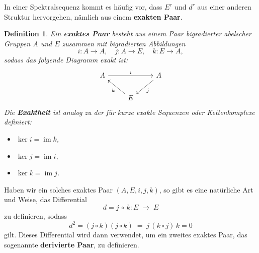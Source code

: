 \documentclass[12pt]{article}
\numberwithin{conj}{section}
\newtheorem{definition}[conj]{Definition}
\newcommand{\ima}{\operatorname{im}}
\begin{document}
    In einer Spektralsequenz kommt es häufig vor, dass $E^{r}$ und $d^{r}$ aus
        einer anderen Struktur hervorgehen, nämlich aus einem \textbf{exakten Paar}.

    \begin{definition}
        Ein \textbf{exaktes Paar} besteht aus einem Paar bigradierter abelscher Gruppen
        $A$ und $E$ zusammen mit bigradierten Abbildungen
        \[
            i : A \to A, \quad j : A \to E, \quad k : E \to A,
        \]
        sodass das folgende Diagramm exakt ist:
        \[
            \begin{tikzcd}
                A && A \\ & E \arrow["i", from=1-1, to=1-3] \arrow["j", from=1-3, to=2-2]
                \arrow["k", from=2-2, to=1-1]
            \end{tikzcd}
        \]
        Die \textbf{Exaktheit} ist analog zu der für kurze exakte Sequenzen oder Kettenkomplexe
        definiert:
        \begin{itemize}[nolistsep]
            \item $\ker i = \ima k$,

            \item $\ker j = \ima i$,

            \item $\ker k = \ima j$.
        \end{itemize}
    \end{definition}

    Haben wir ein solches exaktes Paar $(A,E,i,j,k)$, so gibt es eine natürliche
    Art und Weise, das Differential
    \[
        d = j \,\circ\, k : E \;\longrightarrow\; E
    \]
    zu definieren, sodass
    \[
        d^{2} = (j \circ k)(j \circ k) \;=\; j\,(k \circ j)\,k = 0
    \]
    gilt. Dieses Differential wird dann verwendet, um ein zweites exaktes Paar, das
    sogenannte \textbf{derivierte Paar}, zu definieren.
\end{document}
